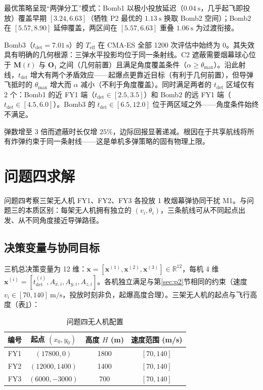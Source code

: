 \documentclass{ctexart}
\begin{document}
最优策略呈现``两弹分工''模式：Bomb1 以极小投放延迟（$0.04\ \mathrm{s}$，几乎起飞即投放）覆盖早期 $[3.24, 6.63]$（牺牲 P2 最优的 $1.13\ \mathrm{s}$ 换取 Bomb2 空间）；Bomb2 在 $[5.57, 8.90]$ 延伸覆盖，两区间在 $[5.57,6.63]$ 重叠 $1.06\ \mathrm{s}$ 为过渡衔接。

Bomb3（$t_{\text{det}}=7.01\ \mathrm{s}$）的 $T_{\text{eff}}$ 在 CMA-ES 全部 1200 次评估中始终为 0。其失效具有明确的几何根源：三弹水平投影均位于同一条射线。C2 遮蔽需要烟幕球心位于 $\mathbf{M}(t)$ 与 $\mathbf{O}_1$ 之间（几何前置）且满足角度覆盖条件（$\alpha \geq \theta_{\max}$）。沿此射线，$t_{\text{det}}$ 增大有两个矛盾效应——起爆点更靠近目标（有利于几何前置），但导弹飞抵时的 $\theta_{\max}$ 增大而 $\alpha$ 减小（不利于角度覆盖）。同时满足两者的 $t_{\text{det}}$ 区域仅有 2 个：Bomb1 的近 FY1 端（$t_{\text{det}}\in[2.5,3.5]$）和 Bomb2 的远 FY1 端（$t_{\text{det}}\in[4.5,6.0]$）。Bomb3 的 $t_{\text{det}}\in[6.5,12.0]$ 位于两区域之外——角度条件始终不满足。

弹数增至 3 倍而遮蔽时长仅增 $25\%$，边际回报显著递减。根因在于共享航线将所有炸弹约束于同一条射线——这是单机多弹策略的固有物理上限。

\section{问题四求解}
\label{sec:p4}

问题四考察三架无人机 FY1、FY2、FY3 各投放 1 枚烟幕弹协同干扰 M1。与问题三的本质区别：每架无人机拥有独立的 $(v_i,\theta_i)$，三条航线可从不同起点出发、从不同角度接近导弹路径。

\subsection{决策变量与协同目标}

三机总决策变量为 12 维：$\mathbf{x} = [\mathbf{x}^{(1)},\mathbf{x}^{(2)},\mathbf{x}^{(3)}] \in \mathbb{R}^{12}$，每机 4 维 $\mathbf{x}^{(i)} = [t_{\text{det}}^{(i)}, A_{x,i}, A_{y,i}, A_{z,i}]$。各机独立满足与第\ref{sec:p2}节相同的约束（速度 $v_i\in[70,140]\ \mathrm{m/s}$，投放时刻非负，起爆高度合理）。三架无人机的起点与飞行高度（表\ref{tab:drone-config}）：

\begin{table}[H]
\centering
\caption{问题四无人机配置}
\label{tab:drone-config}
\begin{tabular}{c|c|c|c}
\toprule
\textbf{编号} & \textbf{起点 $(x_0, y_0)$} & \textbf{高度 $H$ (m)} & \textbf{速度范围 (m/s)} \\
\midrule
FY1 & $(17800, 0)$    & 1800 & $[70, 140]$ \\
FY2 & $(12000, 1400)$ & 1400 & $[70, 140]$ \\
FY3 & $(6000, -3000)$ & 700  & $[70, 140]$ \\
\bottomrule
\end{tabular}
\end{table}
\end{document}
